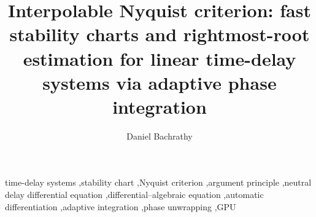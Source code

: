 \documentclass[review,3p,times]{elsarticle}
\begin{document}
\begin{frontmatter}

\title{Interpolable Nyquist criterion: fast stability charts and rightmost-root
estimation for linear time-delay systems via adaptive phase integration}

\author[bme]{Daniel Bachrathy}
\address[bme]{Department of Applied Mechanics, Faculty of Mechanical Engineering,
Budapest University of Technology and Economics, M\H{u}egyetem rkp.~5.,
H-1111 Budapest, Hungary}

\begin{abstract}

\end{abstract}

\begin{keyword}
time-delay systems \sep stability chart \sep Nyquist criterion \sep argument
principle \sep neutral delay differential equation \sep differential--algebraic
equation \sep automatic differentiation \sep adaptive integration \sep phase unwrapping \sep GPU
\end{keyword}

\end{frontmatter}

\linenumbers











\setcounter{maineq}{\value{equation}}
\appendix
\setcounter{equation}{\value{maineq}}
\renewcommand{\theequation}{\arabic{equation}}





\end{document}
